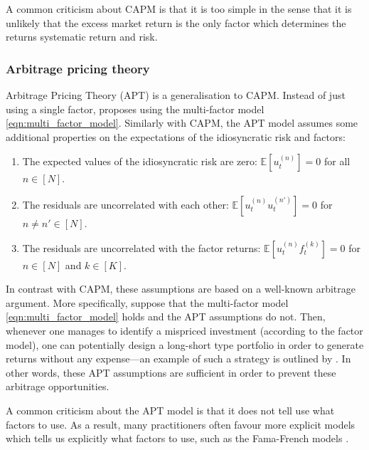 \documentclass[12pt]{article}
\begin{document}
A common criticism about CAPM is that it is too simple in the sense that it is unlikely that the excess market return is the only factor which determines the returns systematic return and risk.
\subsubsection{Arbitrage pricing theory}
Arbitrage Pricing Theory (APT) is a generalisation to CAPM. Instead of just using a single factor, \cite{ross1976joet} proposes using the multi-factor model \eqref{eqn:multi_factor_model}. Similarly with CAPM, the APT model assumes some additional properties on the expectations of the idiosyncratic risk and factors: 
\begin{enumerate}
	\item The expected values of the idiosyncratic risk are zero: $\mathbb{E}[u_t^{(n)}] = 0$ for all $n \in [N]$.
	\item  The residuals are uncorrelated with each other: $\mathbb{E}[u^{(n)}_t u^{(n')}_t] = 0$ for $n \neq n' \in [N]$.
	\item  The residuals are uncorrelated with the factor returns: $\mathbb{E}[u^{(n)}_t f^{(k)}_t] = 0$ for $n \in [N]$ and $k \in [K]$.
\end{enumerate}
In contrast with CAPM, these assumptions are based on a well-known arbitrage argument. More specifically, suppose that the multi-factor model \eqref{eqn:multi_factor_model} holds and the APT assumptions do not. Then, whenever one manages to identify a mispriced investment (according to the factor model), one can potentially design a long-short type portfolio in order to generate returns without any expense---an example of such a strategy is outlined by \citet[Chapter 7]{grinold1999}. In other words, these APT assumptions are sufficient in order to prevent these arbitrage opportunities.

A common criticism about the APT model is that it does not tell use what factors to use. As a result, many practitioners often favour more explicit models which tells us explicitly what factors to use, such as the Fama-French models \citep{fama1993jofe,fama2015jofe}.
\newpage


\end{document}
